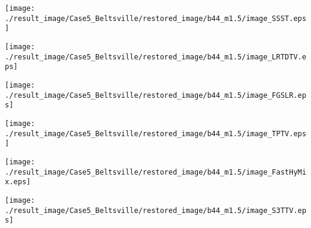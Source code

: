 \begin{figure*}[t]
\begin{center}
		\begin{minipage}{0.125\hsize}
			\centerline{\hspace{\hsize}} %
		\end{minipage}
		\begin{minipage}{0.125\hsize}
			\centerline{\texttt{[image: ./result\_image/Case5\_Beltsville/restored\_image/b44\_m1.5/image\_SSST.eps]}} %
		\end{minipage}
		\begin{minipage}{0.125\hsize}
			\centerline{\texttt{[image: ./result\_image/Case5\_Beltsville/restored\_image/b44\_m1.5/image\_LRTDTV.eps]}} %
		\end{minipage}
		\begin{minipage}{0.125\hsize}
			\centerline{\texttt{[image: ./result\_image/Case5\_Beltsville/restored\_image/b44\_m1.5/image\_FGSLR.eps]}} %
		\end{minipage}
		\begin{minipage}{0.125\hsize}
			\centerline{\texttt{[image: ./result\_image/Case5\_Beltsville/restored\_image/b44\_m1.5/image\_TPTV.eps]}} %
		\end{minipage}
		\begin{minipage}{0.125\hsize}
			\centerline{\texttt{[image: ./result\_image/Case5\_Beltsville/restored\_image/b44\_m1.5/image\_FastHyMix.eps]}} %
		\end{minipage}
		\begin{minipage}{0.125\hsize}
			\centerline{\texttt{[image: ./result\_image/Case5\_Beltsville/restored\_image/b44\_m1.5/image\_S3TTV.eps]}} %
		\end{minipage}
		\begin{minipage}{0.050\hsize}
			\centerline{\hspace{\hsize}} %
		\end{minipage}
		
		\vspace{1mm}
		

\end{center}
\end{figure*}
